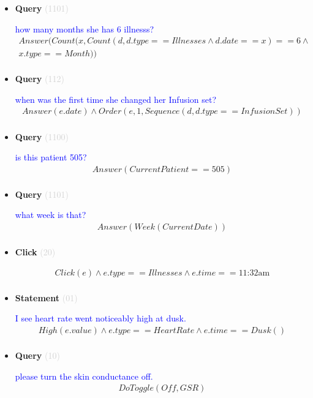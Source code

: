 \documentclass[11pt]{article}
\newcommand{\key}[1]{\textcolor{lightgray}{#1}}
\newcounter{CQuery}
\newcounter{CStatement}
\newcounter{CClick}
\begin{document}
\begin{itemize}
\item
\textbf{Query\theCQuery} \key{(1101)} \addtocounter{CQuery}{1}
\textcolor{blue}{ how many months she has 6 illnesss? }
\begin{multline*}
Answer(Count(x, Count(d, d.type==Illnesses \wedge d.date==x)==6 \wedge \\ 
x.type==Month)) \\ 
\end{multline*}


\item
\textbf{Query\theCQuery} \key{(112)} \addtocounter{CQuery}{1}
\textcolor{blue}{ when was the first time she changed her Infusion set? }
\begin{multline*}
Answer(e.date) \wedge Order(e, 1, Sequence(d, d.type==InfusionSet)) \\ 
\end{multline*}


\item
\textbf{Query\theCQuery} \key{(1100)} \addtocounter{CQuery}{1}
\textcolor{blue}{ is this patient 505? }
\begin{multline*}
Answer(CurrentPatient==505) \\ 
\end{multline*}


\item
\textbf{Query\theCQuery} \key{(1101)} \addtocounter{CQuery}{1}
\textcolor{blue}{ what week is that? }
\begin{multline*}
Answer(Week(CurrentDate)) \\ 
\end{multline*}


\item
\textbf{Click\theCClick} \key{(20)} \addtocounter{CClick}{1}
\textcolor{blue}{  }
\begin{multline*}
Click(e) \wedge e.type==Illnesses \wedge e.time==\mbox{11:32am} \\ 
\end{multline*}


\item
\textbf{Statement\theCStatement} \key{(01)} \addtocounter{CStatement}{1}
\textcolor{blue}{ I see heart rate went noticeably high at dusk. }
\begin{multline*}
High(e.value) \wedge e.type==HeartRate \wedge e.time==Dusk() \\ 
\end{multline*}


\item
\textbf{Query\theCQuery} \key{(10)} \addtocounter{CQuery}{1}
\textcolor{blue}{ please turn the skin conductance off. }
\begin{multline*}
DoToggle(Off, GSR) \\ 
\end{multline*}



\end{itemize}
\end{document}

